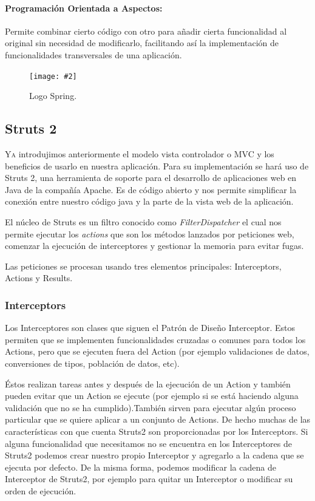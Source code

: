 \documentclass[12pt,a4paper,spanish]{book} %
\newcommand{\imgCentradaMed}[3]{
\begin{figure}[H]
\begin{center}
\texttt{[image: \#2]}
\caption{#3}
\label{#1}
\end{center}
\end{figure}
}
\begin{document}
\paragraph{Programación Orientada a Aspectos: }Permite combinar cierto código con otro para añadir cierta funcionalidad al original sin necesidad de modificarlo, facilitando así la implementación de funcionalidades transversales de una aplicación.

\imgCentradaMed{fig.2.17}{img/spring.eps}{Logo Spring.}

\newpage
\subsection{Struts 2}

\lettrine{Y}{a} introdujimos anteriormente el modelo vista controlador o MVC y los beneficios de usarlo en nuestra aplicación. Para su implementación se hará uso de Struts 2, una herramienta de soporte para el desarrollo de aplicaciones web en Java de la compañía Apache. Es de código abierto y nos permite simplificar la conexión entre nuestro código java y la parte de la vista web de la aplicación.

El núcleo de Struts es un filtro conocido como \emph{FilterDispatcher} el cual nos permite ejecutar los \emph{actions} que son los métodos lanzados por peticiones web, comenzar la ejecución de interceptores y gestionar la memoria para evitar fugas.

Las peticiones se procesan usando tres elementos principales: Interceptors, Actions y Results.

\subsubsection{Interceptors}

Los Interceptores son clases que siguen el Patrón de Diseño Interceptor. Estos permiten que se implementen funcionalidades cruzadas o comunes para todos los Actions, pero que se ejecuten fuera del Action (por ejemplo validaciones de datos, conversiones de tipos, población de datos, etc).

Éstos realizan tareas antes y después de la ejecución de un Action y también pueden evitar que un Action se ejecute (por ejemplo si se está haciendo alguna validación que no se ha cumplido).También sirven para ejecutar algún proceso particular que se quiere aplicar a un conjunto de Actions. De hecho muchas de las características con que cuenta Struts2 son proporcionadas por los Interceptors.
Si alguna funcionalidad que necesitamos no se encuentra en los Interceptores de Struts2 podemos crear nuestro propio Interceptor y agregarlo a la cadena que se ejecuta por defecto. De la misma forma, podemos modificar la cadena de Interceptor de Struts2, por ejemplo para quitar un Interceptor o modificar su orden de ejecución.
\end{document}
